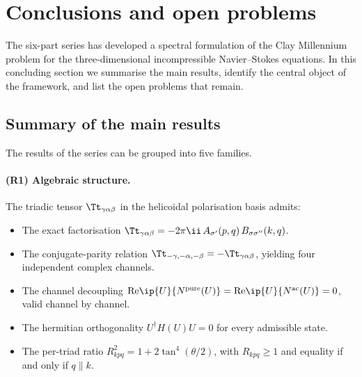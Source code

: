 \section{Conclusions and open problems}
\label{sec:conclusions}

The six-part series has developed a spectral formulation of the Clay 
Millennium problem for the three-dimensional incompressible 
Navier--Stokes equations. In this concluding section we summarise 
the main results, identify the central object of the framework, and 
list the open problems that remain.

\subsection{Summary of the main results}
\label{ssec:summary}

The results of the series can be grouped into five families.

\paragraph{(R1) Algebraic structure.}
The triadic tensor $\Tt_{\gamma\alpha\beta}$ in the helicoidal 
polarisation basis admits:
\begin{itemize}[leftmargin=*]
\item The exact factorisation $\Tt_{\gamma\alpha\beta} = 
      -2\pi\ii\, A_{\sigma'}(p,q)\, B_{\sigma\sigma''}(k,q)$.
\item The conjugate-parity relation $\Tt_{-\gamma,-\alpha,-\beta} 
      = -\Tt_{\gamma\alpha\beta}$, yielding four independent complex 
      channels.
\item The channel decoupling $\mathrm{Re}\ip{U}{N^{\mathrm{pure}}(U)} 
      = \mathrm{Re}\ip{U}{N^{\mathrm{ac}}(U)} = 0$, valid channel by 
      channel.
\item The hermitian orthogonality $U^\dagger H(U) U = 0$ for every 
      admissible state.
\item The per-triad ratio $R_{kpq}^2 = 1 + 2\tan^4(\theta/2)$, with 
      $R_{kpq}\geq 1$ and equality if and only if $q\parallel k$.
\end{itemize}

